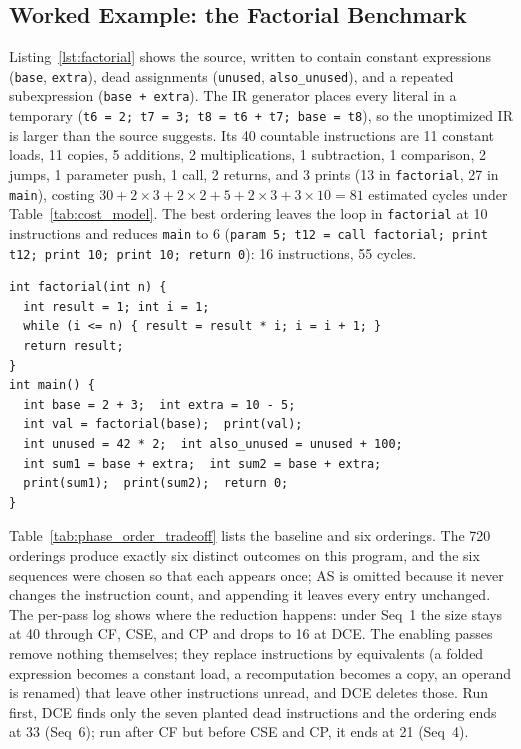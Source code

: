 \documentclass[conference]{IEEEtran}
\begin{document}
\subsection{Worked Example: the Factorial Benchmark}
\label{sec:factorial}
Listing~\ref{lst:factorial} shows the source, written to contain constant expressions (\texttt{base}, \texttt{extra}), dead assignments (\texttt{unused}, \texttt{also\_unused}), and a repeated subexpression (\texttt{base + extra}). The IR generator places every literal in a temporary (\texttt{t6 = 2; t7 = 3; t8 = t6 + t7; base = t8}), so the unoptimized IR is larger than the source suggests. Its 40 countable instructions are 11 constant loads, 11 copies, 5 additions, 2 multiplications, 1 subtraction, 1 comparison, 2 jumps, 1 parameter push, 1 call, 2 returns, and 3 prints (13 in \texttt{factorial}, 27 in \texttt{main}), costing $30 + 2 \times 3 + 2 \times 2 + 5 + 2 \times 3 + 3 \times 10 = 81$ estimated cycles under Table~\ref{tab:cost_model}. The best ordering leaves the loop in \texttt{factorial} at 10 instructions and reduces \texttt{main} to 6 (\texttt{param 5; t12 = call factorial; print t12; print 10; print 10; return 0}): 16 instructions, 55 cycles.

\begin{lstlisting}[caption={The \texttt{factorial} benchmark (comments removed).},label={lst:factorial}]
int factorial(int n) {
  int result = 1; int i = 1;
  while (i <= n) { result = result * i; i = i + 1; }
  return result;
}
int main() {
  int base = 2 + 3;  int extra = 10 - 5;
  int val = factorial(base);  print(val);
  int unused = 42 * 2;  int also_unused = unused + 100;
  int sum1 = base + extra;  int sum2 = base + extra;
  print(sum1);  print(sum2);  return 0;
}
\end{lstlisting}

Table~\ref{tab:phase_order_tradeoff} lists the baseline and six orderings. The 720 orderings produce exactly six distinct outcomes on this program, and the six sequences were chosen so that each appears once; AS is omitted because it never changes the instruction count, and appending it leaves every entry unchanged. The per-pass log shows where the reduction happens: under Seq~1 the size stays at 40 through CF, CSE, and CP and drops to 16 at DCE. The enabling passes remove nothing themselves; they replace instructions by equivalents (a folded expression becomes a constant load, a recomputation becomes a copy, an operand is renamed) that leave other instructions unread, and DCE deletes those. Run first, DCE finds only the seven planted dead instructions and the ordering ends at 33 (Seq~6); run after CF but before CSE and CP, it ends at 21 (Seq~4).
\end{document}
